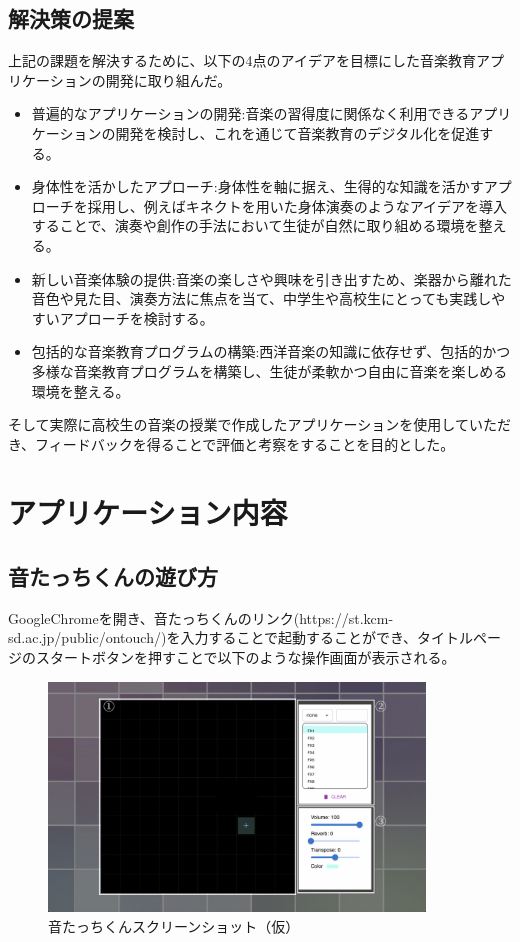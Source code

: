 \documentclass[platex,dvipdfmx]{jlreq}			%
\begin{document}
\subsection{解決策の提案}
上記の課題を解決するために、以下の4点のアイデアを目標にした音楽教育アプリケーションの開発に取り組んだ。
\begin{itemize}
  \item 普遍的なアプリケーションの開発:音楽の習得度に関係なく利用できるアプリケーションの開発を検討し、これを通じて音楽教育のデジタル化を促進する。
  \item 身体性を活かしたアプローチ:身体性を軸に据え、生得的な知識を活かすアプローチを採用し、例えばキネクトを用いた身体演奏のようなアイデアを導入することで、演奏や創作の手法において生徒が自然に取り組める環境を整える。
  \item 新しい音楽体験の提供:音楽の楽しさや興味を引き出すため、楽器から離れた音色や見た目、演奏方法に焦点を当て、中学生や高校生にとっても実践しやすいアプローチを検討する。
  \item 包括的な音楽教育プログラムの構築:西洋音楽の知識に依存せず、包括的かつ多様な音楽教育プログラムを構築し、生徒が柔軟かつ自由に音楽を楽しめる環境を整える。
\end{itemize}
そして実際に高校生の音楽の授業で作成したアプリケーションを使用していただき、フィードバックを得ることで評価と考察をすることを目的とした。

\section{アプリケーション内容}
\subsection{音たっちくんの遊び方}
GoogleChromeを開き、音たっちくんのリンク(https://st.kcm-sd.ac.jp/public/ontouch/)を入力することで起動することができ、タイトルページのスタートボタンを押すことで以下のような操作画面が表示される。
\newpage

\begin{figure}
\centering
\includegraphics[width=100mm]{figures/onTouch_screenShots1.png}
\caption{音たっちくんスクリーンショット（仮）}
\label{fig:model}
\end{figure}
\end{document}

